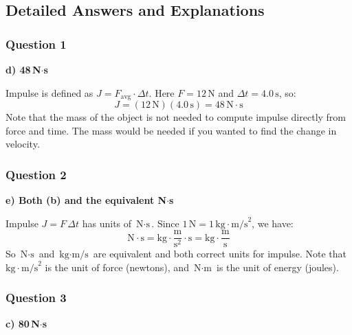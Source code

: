 \documentclass[12pt,letterpaper]{article}
\begin{document}
\newpage
\subsection*{Detailed Answers and Explanations}

\subsubsection*{Question 1}

\begin{answerbox}
\textbf{d) 48\,N$\cdot$s}
\end{answerbox}

\begin{explanationbox}
Impulse is defined as $J = F_{\text{avg}} \cdot \Delta t$. Here $F = 12\,\text{N}$ and $\Delta t = 4.0\,\text{s}$, so:
\[
J = (12\,\text{N})(4.0\,\text{s}) = 48\,\text{N}\cdot\text{s}
\]
Note that the mass of the object is not needed to compute impulse directly from force and time. The mass would be needed if you wanted to find the change in velocity.
\end{explanationbox}

\subsubsection*{Question 2}

\begin{answerbox}
\textbf{e) Both (b) and the equivalent N$\cdot$s}
\end{answerbox}

\begin{explanationbox}
Impulse $J = F\,\Delta t$ has units of $\text{N}\cdot\text{s}$. Since $1\,\text{N} = 1\,\text{kg}\cdot\text{m/s}^2$, we have:
\[
\text{N}\cdot\text{s} = \text{kg}\cdot\frac{\text{m}}{\text{s}^2}\cdot\text{s} = \text{kg}\cdot\frac{\text{m}}{\text{s}}
\]
So $\text{N}\cdot\text{s}$ and $\text{kg}\cdot\text{m/s}$ are equivalent and both correct units for impulse. Note that $\text{kg}\cdot\text{m/s}^2$ is the unit of force (newtons), and $\text{N}\cdot\text{m}$ is the unit of energy (joules).
\end{explanationbox}

\subsubsection*{Question 3}

\begin{answerbox}
\textbf{c) 80\,N$\cdot$s}
\end{answerbox}
\end{document}
